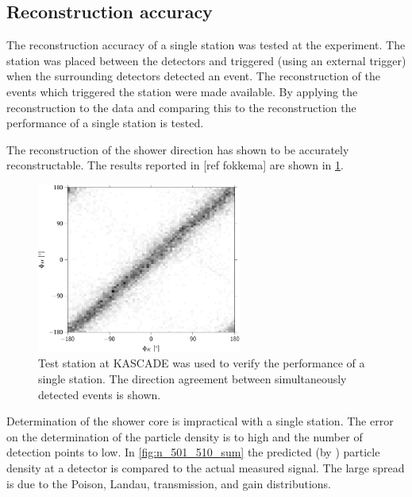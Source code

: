 \subsection{Reconstruction accuracy}

The reconstruction accuracy of a single \hisparc station was tested at the \kascade experiment. The \hisparc station was placed between the \kascade detectors and triggered (using an external trigger) when the surrounding detectors detected an event. The \kascade reconstruction of the events which triggered the \hisparc station were made available. By applying the reconstruction to the data and comparing this to the \kascade reconstruction the performance of a single station is tested.

The reconstruction of the shower direction has shown to be accurately reconstructable. The results reported in [ref fokkema] are shown in \cref{fig:azimuth_kascade_minn1}.

\begin{figure}
    \centering
    \includegraphics[width=0.6\textwidth]
                    {plots/experiment/azimuth_kascade_minn1}
    \caption{Test station at KASCADE was used to verify the performance of a single station. The direction agreement between simultaneously detected events is shown.}
    \label{fig:azimuth_kascade_minn1}
\end{figure}

Determination of the shower core is impractical with a single station. The error on the determination of the particle density is to high and the number of detection points to low. In \cref{fig:n_501_510_sum} the predicted (by \kascade) particle density at a detector is compared to the actual measured signal. The large spread is due to the Poison, Landau, transmission, and \pmt gain distributions.

